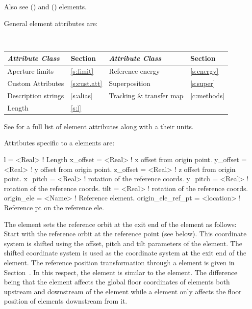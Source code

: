 Also see  () and  () elements.

General  element attributes are:
\begin{center}
\tt
\begin{tabular}{llll} \toprule
  {\sl Attribute Class}      & Section           & {\sl Attribute Class}      & Section         \\ \midrule
  Aperture limits            & \ref{s:limit}     & Reference energy           & \ref{s:energy}  \\
  Custom Attributes          & \ref{s:cust.att}  & Superposition              & \ref{s:super}   \\
  Description strings        & \ref{s:alias}     & Tracking \& transfer map   & \ref{c:methods} \\
  Length                     & \ref{s:l}         &                            &                 \\
  \bottomrule
\end{tabular}
\end{center}
\toffset
See  for a full list of element attributes along with a their units.

Attributes specific to a  elements are:
\begin{example}
  l                 = <Real>     ! Length
  x_offset          = <Real>     ! x offset from origin point.
  y_offset          = <Real>     ! y offset from origin point.
  z_offset          = <Real>     ! z offset from origin point.
  x_pitch           = <Real>     ! rotation of the reference coords.
  y_pitch           = <Real>     ! rotation of the reference coords.
  tilt              = <Real>     ! rotation of the reference coords.
  origin_ele        = <Name>     ! Reference element.
  origin_ele_ref_pt = <location> ! Reference pt on the reference ele.
\end{example}

The  element sets the reference orbit at the exit end of the 
element as follows: Start with the reference orbit at the  reference point (see
below). This coordinate system is shifted using the offset, pitch and tilt parameters of the
 element. The shifted coordinate system is used as the coordinate system at the exit
end of the  element. The reference position transformation through a
 element is given in Section~. In this respect, the 
element is similar to the  element. The difference being that the  element affects
the global floor coordinates of elements both upstream and downstream of the  element while a
 element only affects the floor position of elements downstream from it.
 
